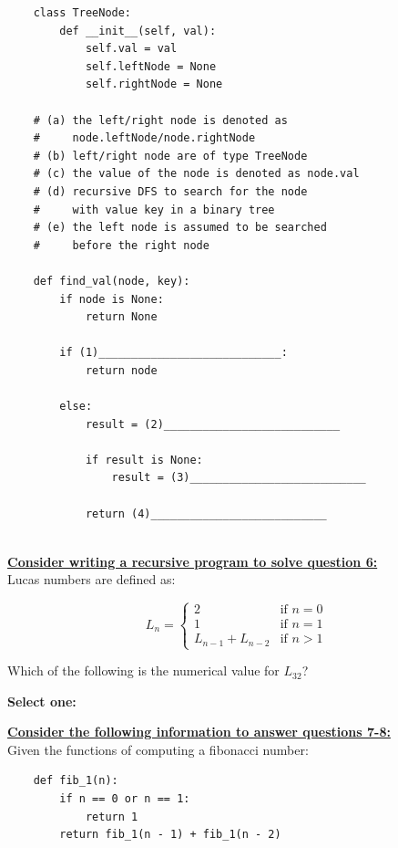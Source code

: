 \documentclass[11pt,addpoints,answers]{exam}
\numberwithin{equation}{section} %
\numberwithin{figure}{section} %
\numberwithin{table}{section} %
\begin{document}
\begin{questions}
    \begin{lstlisting}
    class TreeNode:
        def __init__(self, val):
            self.val = val
            self.leftNode = None
            self.rightNode = None
        
    # (a) the left/right node is denoted as
    #     node.leftNode/node.rightNode
    # (b) left/right node are of type TreeNode
    # (c) the value of the node is denoted as node.val
    # (d) recursive DFS to search for the node 
    #     with value key in a binary tree
    # (e) the left node is assumed to be searched 
    #     before the right node
        
    def find_val(node, key):
        if node is None:
            return None
            
        if (1)____________________________:
            return node
            
        else:
            result = (2)___________________________
            
            if result is None:
                result = (3)___________________________
                
            return (4)___________________________
                
    \end{lstlisting}
    
    \clearpage
    \textbf{\underline{Consider writing a recursive program to solve question 6:}} \\
    Lucas numbers are defined as:
    
    \[ L_n = \begin{cases} 
          2 & \text{if } n = 0\\
          1 & \text{if } n = 1\\
          L_{n-1} + L_{n-2} & \text{if } n > 1
       \end{cases}
    \]
    
    \question[2] Which of the following is the numerical value for $L_{32}$? 

    \textbf{Select one:}
    \begin{checkboxes}
    \end{checkboxes}

    \bigskip
    \textbf{\underline{Consider the following information to answer questions 7-8:}} \\
    Given the functions of computing a fibonacci number:
    \begin{lstlisting}
    def fib_1(n):
        if n == 0 or n == 1:
            return 1
        return fib_1(n - 1) + fib_1(n - 2)
        

\end{lstlisting}
\end{questions}
\end{document}
